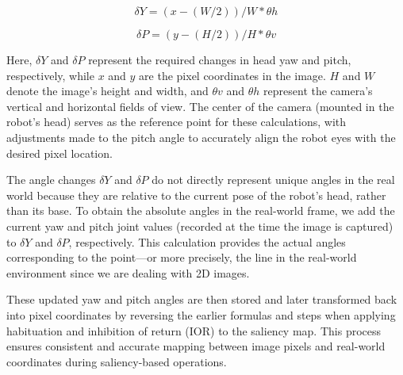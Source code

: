 \documentclass{CSSRforAfrica}
\begin{document}
\begin{equation}\label{eqn:imgtoyaw}
	\delta Y=(x-(W/2))/W*\theta h\tag{1}
\end{equation}

\begin{equation}\label{eqn:imgtopitch}
	\delta P=(y-(H/2))/H*\theta v\tag{2}
\end{equation}

Here, $\delta Y$ and $\delta P$ represent the required changes in head yaw and pitch, respectively, while $x$ and $y$ are the pixel coordinates in the image. $H$ and $W$ denote the image’s height and width, and  $\theta v$ and $\theta h$ represent the camera's vertical and horizontal fields of view. The center of the camera (mounted in the robot's head) serves as the reference point for these calculations, with adjustments made to the pitch angle to accurately align the robot eyes with the desired pixel location.


The angle changes $\delta Y$ and $\delta P$ do not directly represent unique angles in the real world because they are relative to the current pose of the robot's head, rather than its base. To obtain the absolute angles in the real-world frame, we add the current yaw and pitch joint values (recorded at the time the image is captured) to $\delta Y$ and $\delta P$, respectively. This calculation provides the actual angles corresponding to the point—or more precisely, the line in the real-world environment since we are dealing with 2D images.

These updated yaw and pitch angles are then stored and later transformed back into pixel coordinates by reversing the earlier formulas and steps when applying habituation and inhibition of return (IOR) to the saliency map. This process ensures consistent and accurate mapping between image pixels and real-world coordinates during saliency-based operations.
\end{document}
